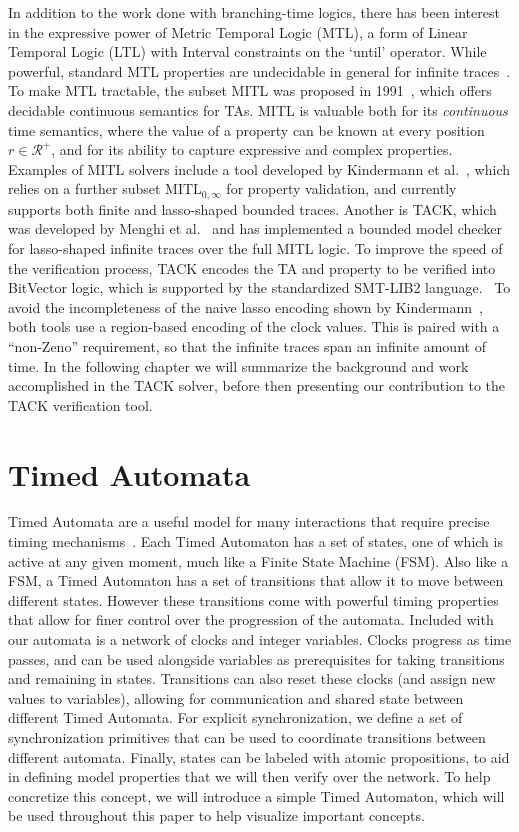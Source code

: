 \documentclass[a4paper,11pt]{report}
\theoremstyle{definition}
\begin{document}
In addition to the work done with branching-time logics, there has been interest
in the expressive power of Metric Temporal Logic (MTL), a form of Linear
Temporal Logic (LTL) with Interval constraints on the `until' operator. While
powerful, standard MTL properties are undecidable in general for infinite
traces~\cite{bouyer09}. To make MTL tractable, the subset MITL was proposed in
1991~\cite{Alur91thebenefits}, which offers decidable continuous semantics for
TAs. MITL is valuable both for its \emph{continuous} time semantics, where the
value of a property can be known at every position $r \in \mathcal{R^{+}}$, and
for its ability to capture expressive and complex properties. Examples of MITL
solvers include a tool developed by Kindermann et al.~\cite{kindermann13}, which
relies on a further subset $\text{MITL}_{0,\infty}$ for property validation, and
currently supports both finite and lasso-shaped bounded traces. Another is TACK,
which was developed by Menghi et al.~\cite{tack20} and has implemented a bounded
model checker for lasso-shaped infinite traces over the full MITL logic. To
improve the speed of the verification process, TACK encodes the TA and property
to be verified into BitVector logic, which is supported by the standardized
SMT-LIB2 language.~\cite{baresi15,baresi16} To avoid the incompleteness of the
naive lasso encoding shown by Kindermann~\cite{kindermann12}, both tools use a
region-based encoding of the clock values. This is paired with a ``non-Zeno''
requirement, so that the infinite traces span an infinite amount of time. In the
following chapter we will summarize the background and work accomplished in the
TACK solver, before then presenting our contribution to the TACK verification
tool.

\section{Timed Automata}\label{timed-automata}

Timed Automata are a useful model for many interactions that require precise
timing mechanisms~\cite{alur94}. Each Timed Automaton has a set of states, one
of which is active at any given moment, much like a Finite State Machine (FSM).
Also like a FSM, a Timed Automaton has a set of transitions that allow it to
move between different states. However these transitions come with powerful
timing properties that allow for finer control over the progression of the
automata. Included with our automata is a network of clocks and integer
variables. Clocks progress as time passes, and can be used alongside variables
as prerequisites for taking transitions and remaining in states. Transitions can
also reset these clocks (and assign new values to variables), allowing for
communication and shared state between different Timed Automata. For explicit
synchronization, we define a set of synchronization primitives that can be used
to coordinate transitions between different automata. Finally, states can be
labeled with atomic propositions, to aid in defining model properties that we
will then verify over the network. To help concretize this concept, we will
introduce a simple Timed Automaton, which will be used throughout this paper to
help visualize important concepts.
\end{document}
